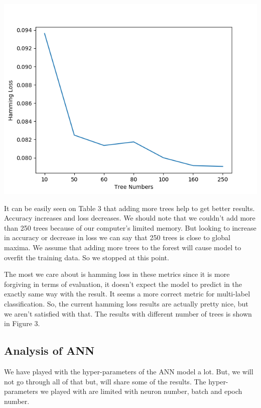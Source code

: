 \documentclass[10pt,twocolumn,letterpaper]{article}
\begin{document}
\includegraphics[width=1\linewidth]{label}

It can be easily seen on Table 3 that adding more trees help to get better results. Accuracy increases and loss decreases. We should note that we couldn't add more than 250 trees because of our computer's limited memory. But looking to increase in accuracy or decrease in loss we can say that 250 trees is close to global maxima. We assume that adding more trees to the forest will cause model to overfit the training data. So we stopped at this point.

The most we care about is hamming loss in these metrics since it is more forgiving in terms of evaluation, it doesn't expect the model to predict in the exactly same way with the result. It seems a more correct metric for multi-label classification. So, the current hamming loss results are actually pretty nice, but we aren't satisfied with that. The results with different number of trees is shown in Figure 3.

\subsection{Analysis of ANN}

We have played with the hyper-parameters of the ANN model a lot. But, we will not go through all of that but, will share some of the results. The hyper-parameters we played with are limited with neuron number, batch and epoch number.
\end{document}
